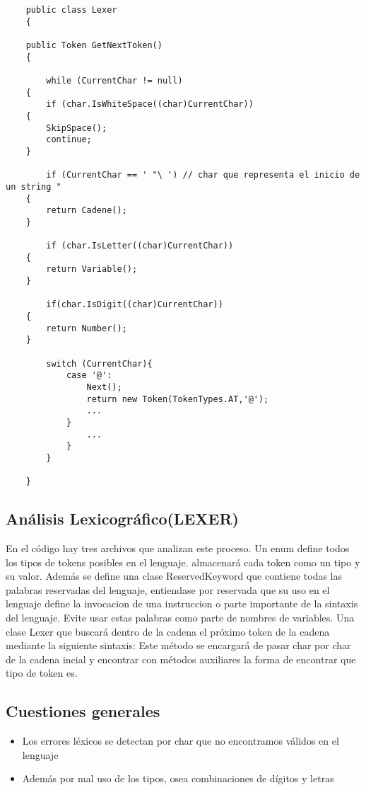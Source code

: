\documentclass[a4paper,12pt]{article}
\begin{document}
\begin{lstlisting}
    public class Lexer
    {
        
    public Token GetNextToken()
    {
            
        while (CurrentChar != null)
    {
        if (char.IsWhiteSpace((char)CurrentChar))
    {
        SkipSpace(); 
        continue;
    }
    
        if (CurrentChar == ' "\ ') // char que representa el inicio de un string "
    {
        return Cadene();
    }
    
        if (char.IsLetter((char)CurrentChar))
    {
        return Variable();
    }           
    
        if(char.IsDigit((char)CurrentChar))
    {
        return Number();
    }
    
        switch (CurrentChar){
            case '@':
                Next();
                return new Token(TokenTypes.AT,'@');
                ...
            }
                ... 
            }
        }
                
    }
        \end{lstlisting}

\subsection{An\'alisis Lexicogr\'afico(LEXER)}\label{sub:center}
    En el c\'odigo hay tres archivos que analizan este proceso. Un enum define todos los tipos de tokens posibles en el lenguaje.
    almacenar\'a cada token como un tipo y su valor. Adem\'as se define una clase ReservedKeyword que contiene todas las palabras reservadas del lenguaje, entiendase por reservada que su uso en el lenguaje define la invocacion de una instruccion o parte importante de la sintaxis del lenguaje. Evite usar estas palabras como parte de nombres de variables.
    Una clase Lexer que buscar\'a dentro de la cadena el pr\'oximo token de la cadena mediante la siguiente sintaxis:
    Este m\'etodo se encargar\'a de pasar char por char de la cadena incial y encontrar con m\'etodos auxiliares la forma de encontrar que tipo de token es.

    \subsection*{Cuestiones generales}
    \begin{itemize}
        \item Los errores l\'exicos se detectan por char que no encontramos v\'alidos en el lenguaje
        \item Adem\'as por mal uso de los tipos, osea combinaciones de d\'igitos y letras
    \end{itemize}
\end{document}
